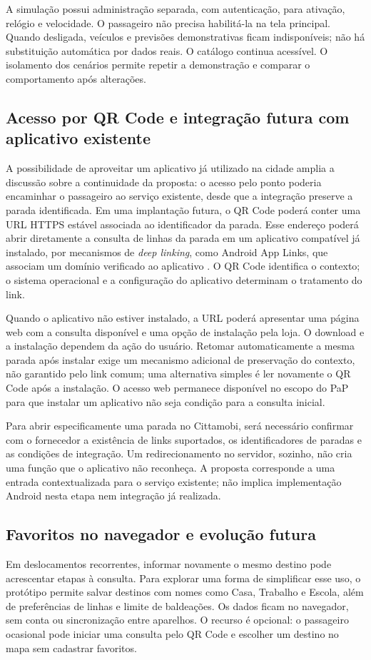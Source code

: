 \documentclass[12pt,oneside,a4paper,brazil]{abntex2}
\begin{document}
A simulação possui administração separada, com autenticação, para ativação, relógio e velocidade. O passageiro não precisa habilitá-la na tela principal. Quando desligada, veículos e previsões demonstrativas ficam indisponíveis; não há substituição automática por dados reais. O catálogo continua acessível. O isolamento dos cenários permite repetir a demonstração e comparar o comportamento após alterações.

\subsection{Acesso por QR Code e integração futura com aplicativo existente}
A possibilidade de aproveitar um aplicativo já utilizado na cidade amplia a discussão sobre a continuidade da proposta: o acesso pelo ponto poderia encaminhar o passageiro ao serviço existente, desde que a integração preserve a parada identificada. Em uma implantação futura, o QR Code poderá conter uma URL HTTPS estável associada ao identificador da parada. Esse endereço poderá abrir diretamente a consulta de linhas da parada em um aplicativo compatível já instalado, por mecanismos de \textit{deep linking}, como Android App Links, que associam um domínio verificado ao aplicativo \citep{androidapplinks}. O QR Code identifica o contexto; o sistema operacional e a configuração do aplicativo determinam o tratamento do link.

Quando o aplicativo não estiver instalado, a URL poderá apresentar uma página web com a consulta disponível e uma opção de instalação pela loja. O download e a instalação dependem da ação do usuário. Retomar automaticamente a mesma parada após instalar exige um mecanismo adicional de preservação do contexto, não garantido pelo link comum; uma alternativa simples é ler novamente o QR Code após a instalação. O acesso web permanece disponível no escopo do PaP para que instalar um aplicativo não seja condição para a consulta inicial.

Para abrir especificamente uma parada no Cittamobi, será necessário confirmar com o fornecedor a existência de links suportados, os identificadores de paradas e as condições de integração. Um redirecionamento no servidor, sozinho, não cria uma função que o aplicativo não reconheça. A proposta corresponde a uma entrada contextualizada para o serviço existente; não implica implementação Android nesta etapa nem integração já realizada.

\subsection{Favoritos no navegador e evolução futura}
Em deslocamentos recorrentes, informar novamente o mesmo destino pode acrescentar etapas à consulta. Para explorar uma forma de simplificar esse uso, o protótipo permite salvar destinos com nomes como Casa, Trabalho e Escola, além de preferências de linhas e limite de baldeações. Os dados ficam no navegador, sem conta ou sincronização entre aparelhos. O recurso é opcional: o passageiro ocasional pode iniciar uma consulta pelo QR Code e escolher um destino no mapa sem cadastrar favoritos.
\end{document}
